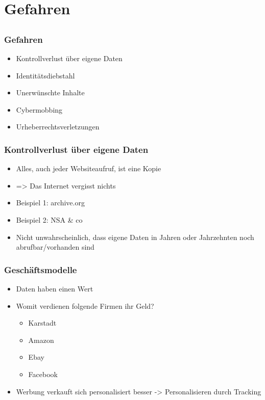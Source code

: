 \section{Gefahren}
\subsection{}

\begin{frame}
  \frametitle{Gefahren}
  \begin{itemize}
    \item<2-> Kontrollverlust über eigene Daten
    \item<3-> Identitätsdiebstahl
    \item<4-> Unerwünschte Inhalte
    \item<5-> Cybermobbing
    \item<6-> Urheberrechtsverletzungen
  \end{itemize}
\end{frame}

\begin{frame}
  \frametitle{Kontrollverlust über eigene Daten}
  \begin{itemize}
    \item<2-> Alles, auch jeder Websiteaufruf, ist eine Kopie
    \item<3-> => Das Internet vergisst nichts 
    \item<4-> Beispiel 1: archive.org
    \item<5-> Beispiel 2: NSA \& co
    \item<6-> Nicht unwahrscheinlich, dass eigene Daten in Jahren oder Jahrzehnten noch abrufbar/vorhanden sind
  \end{itemize}
\end{frame}

\begin{frame}
  \frametitle{Geschäftsmodelle}
  \begin{itemize}
    \item<2-> Daten haben einen Wert
    \item<3-> Womit verdienen folgende Firmen ihr Geld?
      \begin{itemize}
        \item<4-> Karstadt
        \item<5-> Amazon
        \item<6-> Ebay
        \item<7-> Facebook
      \end{itemize}
      \item<8-> Werbung verkauft sich personalisiert besser -> Personalisieren durch Tracking
  \end{itemize}
\end{frame}


